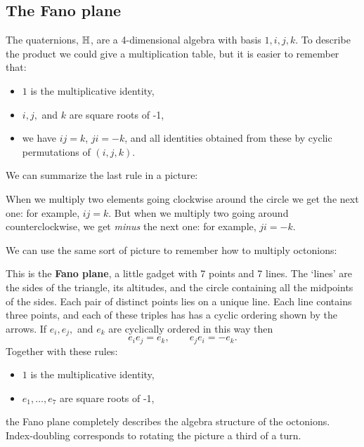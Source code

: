 \subsection{The Fano plane}    \label{fano}   
   
The quaternions, ${\mathbb H}$, are a 4-dimensional algebra with basis $1,i,j,k$.   
To describe the product we could give a multiplication   
table, but it is easier to remember that:   
\begin{itemize}   
\item $1$ is the multiplicative identity,   
\item $i,j,$ and $k$ are square roots of -1,   
\item we have $ij = k$, $ji = -k$, and all identities obtained    
from these by cyclic permutations of $(i,j,k)$.     
\end{itemize}   
We can summarize the last rule in a picture:   
 
\centerline{\epsfysize=1.5in}   
\label{triangle}   
 
\noindent   
When we multiply two elements going clockwise around the circle we get   
the next one: for example, $ij = k$.  But when we multiply two   
going around counterclockwise, we get {\it minus} the next one:    
for example, $ji = -k$.     
   
We can use the same sort of picture to remember how to multiply   
octonions:   
\medskip

\centerline{\epsfysize=1.5in}   
\label{Fano}   
\medskip

\noindent   
This is the {\bf Fano plane}, a little gadget    
with 7 points and 7 lines.  The `lines' are the sides of the triangle,    
its altitudes, and the circle containing all the midpoints of the sides.   
Each pair of distinct points lies on a unique line.  Each line contains    
three points, and each of these triples has has a cyclic ordering    
shown by the arrows.  If $e_i, e_j,$ and $e_k$ are cyclically ordered    
in this way then    
\[            e_i e_j = e_k,  \qquad e_j e_i = -e_k  . \]   
Together with these rules:   
\begin{itemize}   
\item $1$ is the multiplicative identity,   
\item $e_1, \dots, e_7$ are square roots of -1,   
\end{itemize}   
the Fano plane completely describes the algebra structure of the
octonions.   Index-doubling corresponds to rotating the picture
a third of a turn.
   
